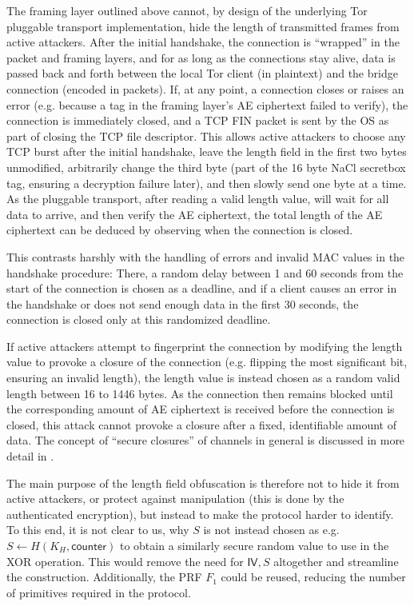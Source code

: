 The framing layer outlined above cannot, by design of the underlying Tor pluggable transport implementation, hide the length of transmitted frames from active attackers.
After the initial handshake, the connection is ``wrapped'' in the packet and framing layers, and for as long as the connections stay alive, data is passed back and forth between the local Tor client (in plaintext) and the bridge connection (encoded in packets).
If, at any point, a connection closes or raises an error (e.g. because a tag in the framing layer's AE ciphertext failed to verify), the connection is immediately closed, and a TCP FIN packet is sent by the OS as part of closing the TCP file descriptor.
This allows active attackers to choose any TCP burst after the initial handshake, leave the length field in the first two bytes unmodified, arbitrarily change the third byte (part of the 16 byte NaCl secretbox tag, ensuring a decryption failure later), and then slowly send one byte at a time. As the pluggable transport, after reading a valid length value, will wait for all data to arrive, and then verify the AE ciphertext, the total length of the AE ciphertext can be deduced by observing when the connection is closed.

This contrasts harshly with the handling of errors and invalid MAC values in the handshake procedure: There, a random delay between 1 and 60 seconds from the start of the connection is chosen as a deadline, and if a client causes an error in the handshake or does not send enough data in the first 30 seconds, the connection is closed only at this randomized deadline.

If active attackers attempt to fingerprint the connection by modifying the length value to provoke a closure of the connection (e.g. flipping the most significant bit, ensuring an invalid length), the length value is instead chosen as a random valid length between 16 to 1446 bytes. As the connection then remains blocked until the corresponding amount of AE ciphertext is received before the connection is closed, this attack cannot provoke a closure after a fixed, identifiable amount of data. The concept of ``secure closures'' of channels in general is discussed in more detail in \cite{CCS:FenJoh24}.

The main purpose of the length field obfuscation is therefore not to hide it from active attackers, or protect against manipulation (this is done by the authenticated encryption), but instead to make the protocol harder to identify. To this end, it is not clear to us, why $S$ is not instead chosen as e.g.~$S \gets H(K_H, \mathsf{counter})$ to obtain a similarly secure random value to use in the XOR operation. This would remove the need for $\mathsf{IV}, S$ altogether and streamline the construction. Additionally, the \drivel{} PRF $F_1$ could be reused, reducing the number of primitives required in the protocol.


